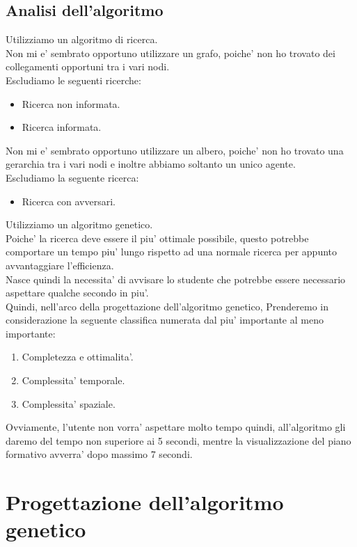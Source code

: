 \documentclass[10pt,a4paper]{article}
\begin{document}
    \subsection{Analisi dell'algoritmo}
      \label{analisiDellAlgoritmoSubsection}
      Utilizziamo un algoritmo di ricerca.\\
      Non mi e' sembrato opportuno utilizzare un grafo, poiche' non ho trovato dei collegamenti opportuni 
      tra i vari nodi.\\
      Escludiamo le seguenti ricerche:
      \begin{itemize}
        \item Ricerca non informata.
        \item Ricerca informata.
      \end{itemize}
      Non mi e' sembrato opportuno utilizzare un albero, poiche' non ho trovato una gerarchia tra i vari nodi e 
      inoltre abbiamo soltanto un unico agente.\\
      Escludiamo la seguente ricerca:
      \begin{itemize}
        \item Ricerca con avversari.
      \end{itemize}
      Utilizziamo un algoritmo genetico.\\
      Poiche' la ricerca deve essere il piu' ottimale possibile, questo 
      potrebbe comportare un tempo piu' lungo rispetto ad una normale ricerca per appunto avvantaggiare l'efficienza.\\
      Nasce quindi la necessita' di avvisare lo studente che potrebbe essere necessario aspettare qualche secondo in piu'.\\
      Quindi, nell'arco della progettazione dell'algoritmo genetico, Prenderemo in considerazione la 
      seguente classifica numerata dal piu' importante al meno importante:
      \begin{enumerate}
        \item Completezza e ottimalita'.
        \item Complessita' temporale.
        \item Complessita' spaziale.
      \end{enumerate}
      Ovviamente, l'utente non vorra' aspettare molto tempo quindi, all'algoritmo gli daremo del tempo 
      non superiore ai 5 secondi, mentre la visualizzazione del piano formativo avverra' dopo massimo 
      7 secondi. 
        
  \section{Progettazione dell'algoritmo genetico}
    \label{progettazioneDellAlgoritmoGeneticoSection}
    
\end{document}
